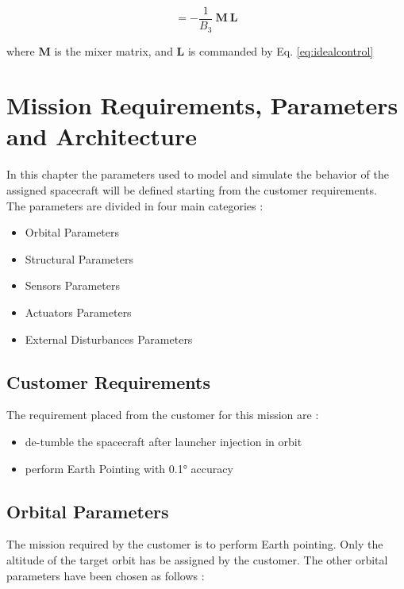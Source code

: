 \documentclass[11pt,a4paper]{report}
\begin{document}
\begin{equation}
 [\mathbf{m_{1:2}} \ \mathbf{\dot{h}_{r}}] = -\frac{1}{B_3} \ \mathbf{M} \ \mathbf{L}
\end{equation}

where $\mathbf{M}$ is the mixer matrix, and $\mathbf{L}$ is commanded by Eq. \ref{eq:idealcontrol}

\chapter{Mission Requirements, Parameters and Architecture }
In this chapter the parameters used to model and simulate the behavior of the assigned spacecraft will be defined starting from the customer requirements.\\
The parameters are divided in four main categories : 

\begin{itemize}
 \item Orbital Parameters
 \item Structural Parameters
 \item Sensors Parameters
 \item Actuators Parameters
 \item External Disturbances Parameters
\end{itemize}

\section{Customer Requirements}
The requirement placed from the customer for this mission are :

\begin{itemize}
 \item de-tumble the spacecraft after launcher injection in orbit
 \item perform Earth Pointing with \ang{0.1} accuracy
\end{itemize}

\section{Orbital Parameters}
The mission required by the customer is to perform Earth pointing. 
Only the altitude of the target orbit has be assigned by the customer. The other orbital parameters have been chosen as follows : 
\end{document}
